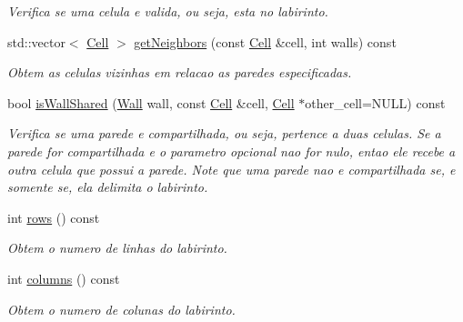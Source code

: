 \begin{DoxyCompactItemize}
\begin{DoxyCompactList}\small\item\em Verifica se uma celula e valida, ou seja, esta no labirinto. \end{DoxyCompactList}\item 
std\+::vector$<$ \hyperlink{struct_labirinto_1_1_cell}{Cell} $>$ \hyperlink{class_labirinto_a49eb1b0dd3bdb40ff020dfff1f5741be}{get\+Neighbors} (const \hyperlink{struct_labirinto_1_1_cell}{Cell} \&cell, int walls) const 
\begin{DoxyCompactList}\small\item\em Obtem as celulas vizinhas em relacao as paredes especificadas. \end{DoxyCompactList}\item 
bool \hyperlink{class_labirinto_affebfa176e56784b0ca6e1c8f5a9d1dc}{is\+Wall\+Shared} (\hyperlink{class_labirinto_ab6ffda1571ea6394c382e12b4bb4c336}{Wall} wall, const \hyperlink{struct_labirinto_1_1_cell}{Cell} \&cell, \hyperlink{struct_labirinto_1_1_cell}{Cell} $\ast$other\+\_\+cell=N\+U\+L\+L) const 
\begin{DoxyCompactList}\small\item\em Verifica se uma parede e compartilhada, ou seja, pertence a duas celulas. Se a parede for compartilhada e o parametro opcional nao for nulo, entao ele recebe a outra celula que possui a parede. Note que uma parede nao e compartilhada se, e somente se, ela delimita o labirinto. \end{DoxyCompactList}\item 
int \hyperlink{class_labirinto_a4f8c7a42d8a5edad12482f4d2110626c}{rows} () const 
\begin{DoxyCompactList}\small\item\em Obtem o numero de linhas do labirinto. \end{DoxyCompactList}\item 
int \hyperlink{class_labirinto_a6614a825d5e93ec1c053003a804ce2a7}{columns} () const 
\begin{DoxyCompactList}\small\item\em Obtem o numero de colunas do labirinto. \end{DoxyCompactList}\end{DoxyCompactItemize}
